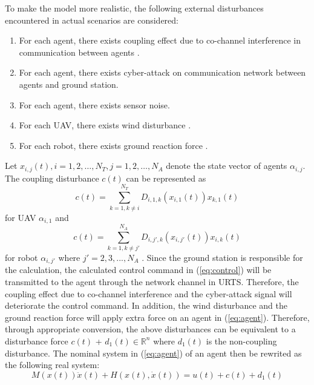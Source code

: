 \documentclass{ieeeaccess}
\begin{document}
To make the model more realistic, the following external disturbances encountered in actual scenarios are considered:
\begin{enumerate}
    \item For each agent, there exists coupling effect due to co-channel interference in communication between agents \cite{9834947}.
    \item For each agent, there exists cyber-attack on communication network between agents and ground station.
    \item For each agent, there exists sensor noise.
    \item For each UAV, there exists wind disturbance \cite{9075385}.
    \item For each robot, there exists ground reaction force \cite{chen2013human}. 
\end{enumerate}
Let $x_{i,j}(t), i=1,2,\dots,N_T, j=1,2,\dots,N_A$ denote the state vector of agents $\alpha_{i,j}$. The coupling disturbance $c(t)$ can be represented as \begin{equation} \label{eq:UAV couple}
    c(t) = \sum_{k = 1, k \neq i}^{N_T}D_{i, 1, k}(x_{i, 1}(t))x_{k, 1}(t)
\end{equation} for UAV $\alpha_{i, 1}$ and \begin{equation} \label{eq:robot couple}
    c(t) = \sum_{k = 1, k \neq j'}^{N_A}D_{i, j', k}(x_{i, j'}(t))x_{i, k}(t)
\end{equation} for robot $\alpha_{i, j'}$ where $j'=2,3,...,N_A$ \cite{9834947}. Since the ground station is responsible for the calculation, the calculated control command in (\ref{eq:control}) will be transmitted to the agent through the network channel in URTS. Therefore, the coupling effect due to co-channel interference and the cyber-attack signal will deteriorate the control command. In addition, the wind disturbance and the ground reaction force will apply extra force on an agent in (\ref{eq:agent}). Therefore, through appropriate conversion, the above disturbances can be equivalent to a disturbance force $c(t)$ + $d_1(t)\in\mathbb{R}^n$ where $d_1(t)$ is the non-coupling disturbance. The nominal system in (\ref{eq:agent}) of an agent then be rewrited as the following real system:
\begin{equation} \label{eq:agent d1} 
    M(x(t))\ddot{x}(t) + H(x(t),\dot{x}(t)) = u(t) + c(t) + d_1(t)
\end{equation}
\end{document}
